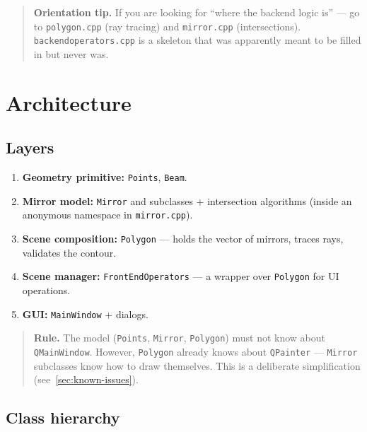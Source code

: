 \documentclass[a4paper,11pt]{article}
\newcommand{\file}[1]{\texttt{#1}}
\newcommand{\code}[1]{\texttt{#1}}
\begin{document}
\begin{quote}
\textbf{Orientation tip.} If you are looking for ``where the backend
logic is'' — go to \file{polygon.cpp} (ray tracing) and
\file{mirror.cpp} (intersections). \file{backendoperators.cpp} is a
skeleton that was apparently meant to be filled in but never was.
\end{quote}

\section{Architecture}

\subsection{Layers}

\begin{enumerate}[label=\textbf{\arabic*.},leftmargin=*]
    \item \textbf{Geometry primitive:} \code{Points}, \code{Beam}.
    \item \textbf{Mirror model:} \code{Mirror} and subclasses + intersection
          algorithms (inside an anonymous namespace in \file{mirror.cpp}).
    \item \textbf{Scene composition:} \code{Polygon} — holds the vector of
          mirrors, traces rays, validates the contour.
    \item \textbf{Scene manager:} \code{FrontEndOperators} — a wrapper over
          \code{Polygon} for UI operations.
    \item \textbf{GUI:} \code{MainWindow} + dialogs.
\end{enumerate}

\begin{quote}
\textbf{Rule.} The model (\code{Points}, \code{Mirror}, \code{Polygon})
must not know about \code{QMainWindow}. However, \code{Polygon} already
knows about \code{QPainter} — \code{Mirror} subclasses know how to draw
themselves. This is a deliberate simplification
(see~\ref{sec:known-issues}).
\end{quote}

\subsection{Class hierarchy}
\end{document}
